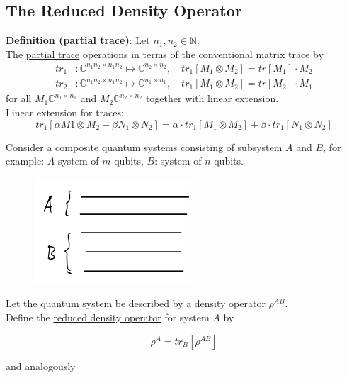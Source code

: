 \subsection{The Reduced Density Operator}

\textbf{Definition (partial trace)}: Let $n_1, n_2 \in \mathbb{N}$. \\
The \underline{partial trace} operations in terms of the conventional matrix trace by
\begin{align}
    tr_1 &: \mathbb{C}^{n_1 n_2 \times n_1 n_2} \mapsto \mathbb{C}^{n_2 \times n_2}, \quad
    tr_1 [M_1 \otimes M_2] = tr[M_1] \cdot M_2 \\
    tr_2 &: \mathbb{C}^{n_1 n_2 \times n_1 n_2} \mapsto \mathbb{C}^{n_1 \times n_1}, \quad
    tr_1 [M_1 \otimes M_2] = tr[M_2] \cdot M_1
\end{align}
for all $M_1 \mathbb{C}^{n_1 \times n_1}$ and $M_2 \mathbb{C}^{n_2 \times n_2}$ together
with linear extension. \\
Linear extension for traces:
\begin{equation*}
    tr_1[\alpha M1 \otimes M_2 + \beta N_1 \otimes N_2] = 
    \alpha \cdot tr_1 [M_1 \otimes M_2] + \beta \cdot tr_1[N_1 \otimes N_2]
\end{equation*}

Consider a composite quantum systems consisting of subsystem $A$ and $B$, for example: 
$A$ system of $m$ qubits, $B$: system of $n$ qubits.

\begin{figure}[H]
    \centering
    \includegraphics[scale=0.5]{chapters/res/density-operator-subsystems.png}
\end{figure}

Let the quantum system be described by a density operator $\rho^{AB}$. \\
Define the \underline{reduced density operator} for system $A$ by 

\begin{equation}
    \rho^A = tr_B [\rho^{AB}]
\end{equation}

and analogously

